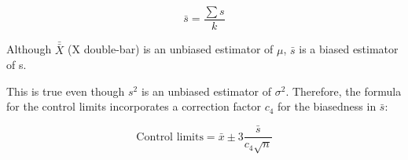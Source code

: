 \documentclass[12pt]{article}
\begin{document}
\[ \bar{s} = \frac{\sum s} {k}  \]


Although
$\bar{\bar{X}}$ (X double-bar) is an unbiased estimator of $\mu$, $\bar{s}$ is a biased estimator of s. 

This is true even
though $s^2$ is an unbiased estimator of $\sigma^2$. Therefore, the formula for the control limits incorporates a correction factor $c_4$
for the biasedness in $\bar{s}$:
{
\large
\begin{framed}
\[ \mbox{Control limits} = \bar{x} \pm 3\frac{\bar{s}}{c_4\sqrt{n}} \]
\end{framed}
}
\end{document}
